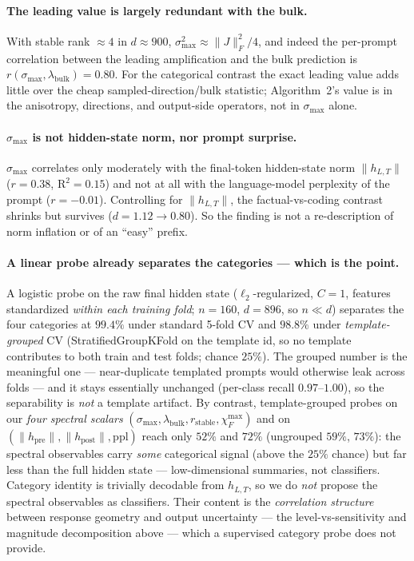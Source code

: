 \documentclass{article}
\begin{document}
\paragraph{The leading value is largely redundant with the bulk.}
With stable rank $\approx4$ in $d\approx900$, $\sigma_{\max}^2\approx\|J\|_F^2/4$, and indeed the
per-prompt correlation between the leading amplification and the bulk prediction is
$r(\sigma_{\max},\lambda_{\mathrm{bulk}})=0.80$. For the categorical contrast the exact leading value
adds little over the cheap sampled-direction/bulk statistic; Algorithm~2's value is in the
anisotropy, directions, and output-side operators, not in $\sigma_{\max}$ alone.

\paragraph{$\sigma_{\max}$ is not hidden-state norm, nor prompt surprise.}
$\sigma_{\max}$ correlates only moderately with the final-token hidden-state norm $\|h_{L,T}\|$
($r=0.38$, $\mathrm{R}^2=0.15$) and not at all with the language-model perplexity of the prompt
($r=-0.01$). Controlling for $\|h_{L,T}\|$, the factual-vs-coding contrast shrinks but survives
($d=1.12\to0.80$). So the finding is not a re-description of norm inflation or of an ``easy'' prefix.

\paragraph{A linear probe already separates the categories --- which is the point.}
A logistic probe on the raw final hidden state ($\ell_2$-regularized, $C=1$, features standardized
\emph{within each training fold}; $n=160$, $d=896$, so $n\!\ll\!d$) separates the four categories at
$99.4\%$ under standard 5-fold CV and $98.8\%$ under \emph{template-grouped} CV (StratifiedGroupKFold
on the template id, so no template contributes to both train and test folds; chance $25\%$). The
grouped number is the meaningful one --- near-duplicate templated prompts would otherwise leak across
folds --- and it stays essentially unchanged (per-class recall $0.97$--$1.00$), so the separability is
\emph{not} a template artifact. By contrast, template-grouped probes on our \emph{four spectral
scalars} $(\sigma_{\max},\lambda_{\mathrm{bulk}},r_{\mathrm{stable}},\chi_F^{\max})$ and on
$(\|h_\text{pre}\|,\|h_\text{post}\|,\text{ppl})$ reach only $52\%$ and $72\%$ (ungrouped $59\%$,
$73\%$): the spectral observables carry \emph{some} categorical signal (above the $25\%$ chance) but
far less than the full hidden state --- low-dimensional summaries, not classifiers. Category identity
is trivially decodable from $h_{L,T}$, so we do \emph{not} propose the spectral observables as
classifiers. Their content is the \emph{correlation structure} between response geometry and output
uncertainty --- the level-vs-sensitivity and magnitude decomposition above --- which a supervised
category probe does not provide.
\end{document}
